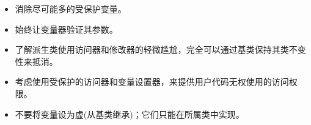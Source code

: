 
\begin{itemize}
\item
消除尽可能多的受保护变量。

\item
始终让变量器验证其参数。

\item
了解派生类使用访问器和修改器的轻微尴尬，完全可以通过基类保持其类不变性来抵消。

\item
考虑使用受保护的访问器和变量设置器，来提供用户代码无权使用的访问权限。

\item
不要将变量设为虚(从基类继承)；它们只能在所属类中实现。
\end{itemize}













